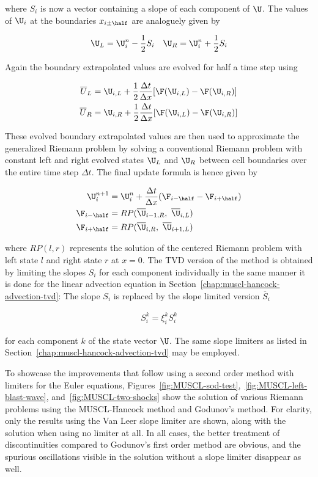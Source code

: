 where $S_i$ is now a vector containing a slope of each component of $\U$. The values of $\U_i$ at
the boundaries $x_{i \pm \half}$ are analoguely given by

\begin{align}
    \U_L = \U_i^n - \frac{1}{2} S_i && \U_R = \U_i^n + \frac{1}{2} S_i
\end{align}

Again the boundary extrapolated values are evolved for half a time step using

\begin{align}
    \overline{U}_L &= \U_{i,L} + \frac{1}{2}\frac{\Delta t}{\Delta x} [\F(\U_{i,L})- \F(\U_{i,R})]\\
    \overline{U}_R &= \U_{i,R} + \frac{1}{2}\frac{\Delta t}{\Delta x} [\F(\U_{i,L})- \F(\U_{i,R})]\\
\end{align}

These evolved boundary extrapolated values are then used to approximate the generalized Riemann
problem by solving a conventional Riemann problem with constant left and right evolved states
$\U_{L}$ and $\U_{R}$ between cell boundaries over the entire time step $\Delta t$. The final
update formula is hence given by

\begin{align}
 \U_i^{n+1} &= \U_i^n + \frac{\Delta t}{\Delta x} (\F_{i-\half} - \F_{i+\half}) \\
 \F_{i-\half} &= RP(\overline{\U}_{i-1, R},\ \overline{\U}_{i,L}) \\
 \F_{i+\half} &= RP(\overline{\U}_{i, R},\ \overline{\U}_{i+1,L})
\end{align}

where $RP(l, r)$ represents the solution of the centered Riemann problem with left state $l$ and
right state $r$ at $x = 0$. The TVD version of the method is obtained by limiting the slopes $S_i$
for each component individually in the same manner it is done for the linear advection equation in
Section~\ref{chap:muscl-hancock-advection-tvd}: The slope $S_i$ is replaced by the slope limited
version $\overline{S}_i$

\begin{align}
    S_i^k = \xi_i^k S_i^k
\end{align}

for each component $k$ of the state vector $\U$. The same slope limiters as listed in
Section~\ref{chap:muscl-hancock-advection-tvd} may be employed.

To showcase the improvements that follow using a second order method with limiters
for the Euler equations, Figures~\ref{fig:MUSCL-sod-test},~\ref{fig:MUSCL-left-blast-wave},
and~\ref{fig:MUSCL-two-shocks} show the solution of various Riemann problems using the MUSCL-Hancock
method and Godunov's method. For clarity, only the results using the Van Leer slope limiter are
shown, along with the solution when using no limiter at all. In all cases, the better treatment of
discontinuities compared to Godunov's first order method are obvious, and the spurious oscillations
visible in the solution without a slope limiter disappear as well.

